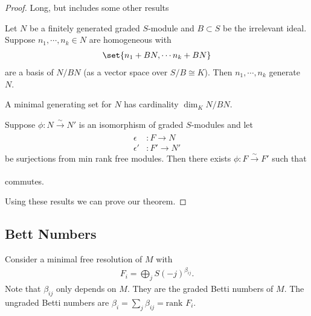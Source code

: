 \begin{proof}
    Long, but includes some other results

    \begin{lemma}
        Let $N$ be a finitely generated graded $S$-module and $B \subset S$ be the irrelevant ideal. Suppose $n_1 , \cdots, n_k \in N$ are homogeneous with
        \begin{align*}
            \set{ n_1 + BN , \cdots n_k + BN}
        \end{align*}
        are a basis of $N / BN$ (as a vector space over $S/B \cong K$). Then $n_1 , \cdots, n_k $ generate $N$.
    \end{lemma}

    \begin{corollary}
        A minimal generating set for $N$ has cardinality $\dim_K N / BN$.
    \end{corollary}

    \begin{lemma}
        Suppose $\phi : N \xrightarrow[]{\sim} N' $ is an isomorphism of graded $S $-modules and let
        \begin{align*}
            \epsilon &: F \to N\\
            \epsilon' &: F' \to N'
        \end{align*}
        be surjections from min rank free modules. Then there exists $\phi : F \xrightarrow[]{\sim} F'$ such that
        \begin{center}
        \end{center}
        commutes.
    \end{lemma}

    Using these results we can prove our theorem.
\end{proof}

\subsection{Bett Numbers}

\begin{definition}
    Consider a minimal free resolution of $M$ with
    \begin{align*}
        F_i = \bigoplus_j S(-j)^{\beta_{i j}}.
    \end{align*}
    Note that $\beta_{ij}$ only depends on $M$. They are the graded Betti numbers of $M$. The ungraded Betti numbers are $\beta_i = \sum_j \beta_{ij} = \text{rank } F_i$.
\end{definition}

